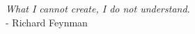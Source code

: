 \null\vskip5cm%
\begin{flushright}
    \textit{What I cannot create, I do not understand.}\\
     - Richard Feynman
\end{flushright}
\vfill\newpage

